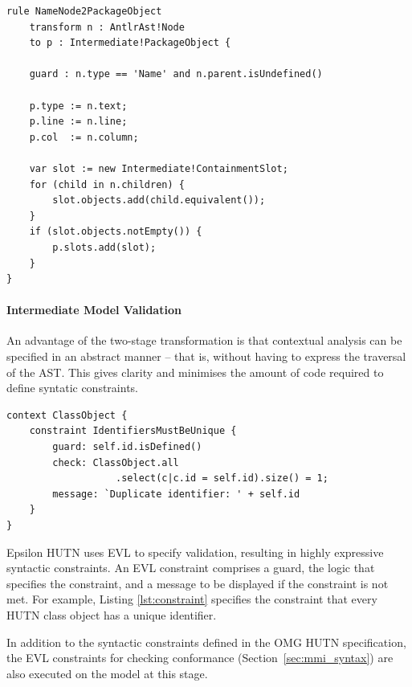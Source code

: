 \begin{lstlisting}[caption=Transforming Nodes to PackageObjects with ETL., label=lst:m2m, language=ETL]
rule NameNode2PackageObject
    transform n : AntlrAst!Node
    to p : Intermediate!PackageObject {

    guard : n.type == 'Name' and n.parent.isUndefined()

    p.type := n.text;
    p.line := n.line;
    p.col  := n.column;

    var slot := new Intermediate!ContainmentSlot;
    for (child in n.children) {
        slot.objects.add(child.equivalent());
    }
    if (slot.objects.notEmpty()) {
        p.slots.add(slot);
    }
}
\end{lstlisting}

\paragraph{Intermediate Model Validation}
An advantage of the two-stage transformation is that contextual analysis can be specified in an abstract manner -- that is, without having to express the traversal of the AST. This gives clarity and minimises the amount of code required to define syntatic constraints.

\begin{lstlisting}[caption=A constraint (in EVL) to check that all identifiers are unique., label=lst:constraint, language=EVL]
context ClassObject {
    constraint IdentifiersMustBeUnique {
        guard: self.id.isDefined()
        check: ClassObject.all
                   .select(c|c.id = self.id).size() = 1;
        message: `Duplicate identifier: ' + self.id
    }
}
\end{lstlisting}

Epsilon HUTN uses EVL \cite{kolovos08evl} to specify validation, resulting in highly expressive syntactic constraints. An EVL constraint comprises a guard, the logic that specifies the constraint, and a message to be displayed if the constraint is not met. For example, Listing \ref{lst:constraint} specifies the constraint that every HUTN class object has a unique identifier.

In addition to the syntactic constraints defined in the OMG HUTN specification, the EVL constraints for checking conformance (Section~\ref{sec:mmi_syntax}) are also executed on the model at this stage.

